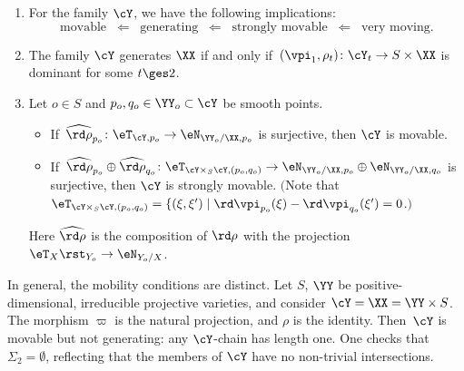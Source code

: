 \begin{m-lemma}\label{lm:mov}\leavevmode
\begin{enumerate}
\item\label{l:mov-1} For the family $\cY$, we have the following implications: 
\[
\text{movable} \;\;\Longleftarrow\;\;\text{generating}\;\;\Longleftarrow\;\;\text{strongly movable}\;\;\Longleftarrow\;\;\text{very moving.}
\]
\item\label{iti:Ygen} 
The family $\cY$ generates $\XX$ if and only if\, $(\vpi_1,\rho_t)\colon\cY_t\to S\times\XX$ is dominant for some $t\ges 2$.
\item\label{l:mov-3}  Let $o\in S$ and $p_o,q_o\in\YY_o\subset\cY$ be smooth points.  
\begin{itemize}
\item If\, $\widehat{\rd\rho}_{p_o}\colon \eT_{\cY, p_o} \to \eN_{\YY_o/\XX,p_o}$ is surjective, then $\cY$ is movable. 
\item If\, $\widehat{\rd\rho}_{p_o}\oplus\widehat{\rd\rho}_{q_o}\colon  \eT_{\cY\times_S\cY, (p_o, q_o)} \to\eN_{\YY_o/\XX,p_o}\oplus\eN_{\YY_o/\XX,q_o}$ 
is surjective, then $\cY$ is strongly movable. $($Note that $\eT_{\cY\times_S\cY, (p_o, q_o)}= \{(\xi,\xi')\mid\rd\vpi_{p_o}(\xi)-\rd\vpi_{q_o}(\xi')=0$.$)$
\end{itemize}
Here $\widehat{\rd\rho}$ is the composition of $\rd\rho$ with the projection $\eT_X\rst_{Y_o}\to\eN_{Y_o/X}$. 
\end{enumerate}
\end{m-lemma}

In general, the mobility conditions are distinct. 
Let $S$, $\YY$ be positive-dimensional, irreducible projective varieties, and consider $\cY=\XX=\YY\times S$. The morphism $\varpi$ is the natural projection, and $\rho$ is the identity. Then~$\cY$ is movable but not generating: any $\cY$-chain has length one. One checks that $\Sigma_2=\emptyset$, reflecting that the members of $\cY$ have no non-trivial intersections.

